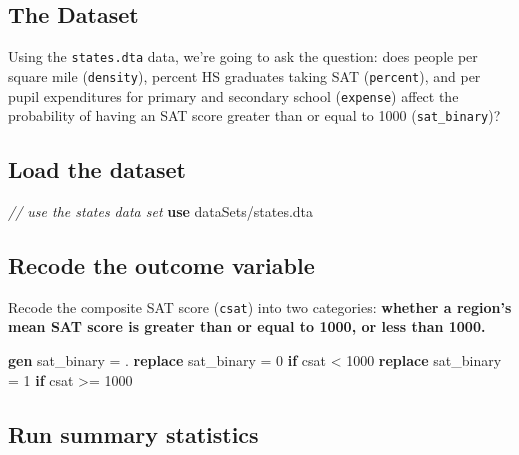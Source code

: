 \documentclass[
]{book}
\newenvironment{Shaded}{\begin{snugshade}}{\end{snugshade}}
\newcommand{\CommentTok}[1]{\textcolor[rgb]{0.56,0.35,0.01}{\textit{#1}}}
\newcommand{\KeywordTok}[1]{\textcolor[rgb]{0.13,0.29,0.53}{\textbf{#1}}}
\newcommand{\NormalTok}[1]{#1}
\begin{document}
\hypertarget{the-dataset-1}{%
\subsection{The Dataset}\label{the-dataset-1}}

Using the \texttt{states.dta} data, we're going to ask the question: does people per square mile (\texttt{density}), percent HS graduates taking SAT (\texttt{percent}), and per pupil expenditures for primary and secondary school (\texttt{expense}) affect the probability of having an SAT score greater than or equal to 1000 (\texttt{sat\_binary})?

\hypertarget{load-the-dataset}{%
\subsection{Load the dataset}\label{load-the-dataset}}

\begin{Shaded}
\begin{Highlighting}[]
\CommentTok{// use the states data set}
\KeywordTok{use}\NormalTok{ dataSets/states.dta}
\end{Highlighting}
\end{Shaded}

\hypertarget{recode-the-outcome-variable}{%
\subsection{Recode the outcome variable}\label{recode-the-outcome-variable}}

Recode the composite SAT score (\texttt{csat}) into two categories: \textbf{whether a region's mean SAT score is greater than or equal to 1000, or less than 1000.}

\begin{Shaded}
\begin{Highlighting}[]
\KeywordTok{gen}\NormalTok{ sat\_binary = .}
\KeywordTok{replace}\NormalTok{ sat\_binary = 0 }\KeywordTok{if}\NormalTok{ csat \textless{} 1000}
\KeywordTok{replace}\NormalTok{ sat\_binary = 1 }\KeywordTok{if}\NormalTok{ csat \textgreater{}= 1000}
\end{Highlighting}
\end{Shaded}

\hypertarget{run-summary-statistics}{%
\subsection{Run summary statistics}\label{run-summary-statistics}}
\end{document}
